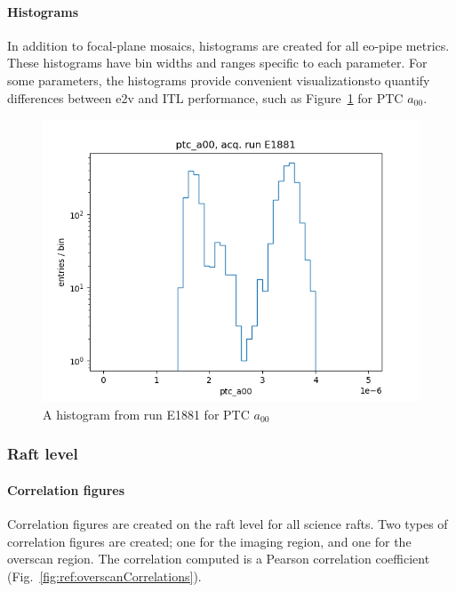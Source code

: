 \paragraph{Histograms}

In addition to focal-plane mosaics, histograms are created for all eo-pipe metrics. These histograms have bin widths and ranges specific to each parameter. For some parameters, the histograms provide convenient visualizationsto quantify differences between e2v and ITL performance, such as Figure~\ref{fig:ref:histogram} for PTC $a_{00}$. 

\begin{figure}[ht]
    \centering
    \includegraphics[width=0.8\linewidth]{figures/ReferenceFigures/ptc_a00_hist_LSSTCam_u_lsstccs_eo_ptc_plots_E1881_w_2024_35_20241105T131208Z.png}
    \caption{A histogram from run E1881 for PTC $a_{00}$}
    \label{fig:ref:histogram}
\end{figure}
\clearpage
\subsubsection{Raft level}

\paragraph{Correlation figures}

Correlation figures are created on the raft level for all science rafts. Two types of correlation figures are created; one for the imaging region, and one for the overscan region. The correlation computed is a Pearson correlation coefficient (Fig.~\ref{fig:ref:overscanCorrelations}).

